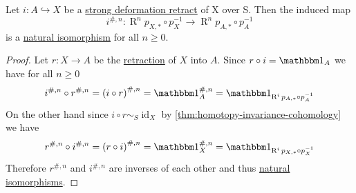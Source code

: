 \documentclass[../../main]{subfiles}
\begin{document}
\begin{corollary}\label{cor:cohomology-and-retraction}
  Let \(i\colon A \hookrightarrow X\) be a \hyperref[def:deformation-retract]{strong deformation retract} of X over S.
  Then the induced map
  \begin{equation*}
    i^{\#, n} \colon \operatorname{R}^{n}p_{X, \ast} \circ p_{X}^{-1} \to \operatorname{R}^{n}p_{A, \ast} \circ p_{A}^{-1}
  \end{equation*}
  is a \hyperref[def:natural-transformation]{natural isomorphism} for all \(n \geq 0\).
\end{corollary}
\begin{proof}
  Let \(r\colon X \to A\) be the \hyperref[def:deformation-retract]{retraction} of \(X\) into \(A\).
  Since \(r \circ i = \id_{A}\) we have for all \(n \geq 0\)
  \begin{equation*}
    i^{\#, n} \circ r^{\#, n} = \left( i \circ r \right)^{\#, n} = \id_{A}^{\#, n} = \id_{\operatorname{R}^{i}p_{A, \ast} \circ p_{A}^{-1}}
  \end{equation*}
  On the other hand since \(i \circ r \sim_{S} \operatorname{id}_{X}\) by \autoref{thm:homotopy-invariance-cohomology} we have
  \begin{equation*}
    r^{\#, n} \circ i^{\#, n} = \left( r \circ i \right)^{\#, n} = \id_{X}^{\#, n} = \id_{\operatorname{R}^{i}p_{X, \ast} \circ p_{X}^{-1}}
  \end{equation*}
  Therefore \(r^{\#, n}\) and \(i^{\#, n}\) are inverses of each other and thus \hyperref[def:natural-transformation]{natural isomorphisms}.
\end{proof}
\end{document}
